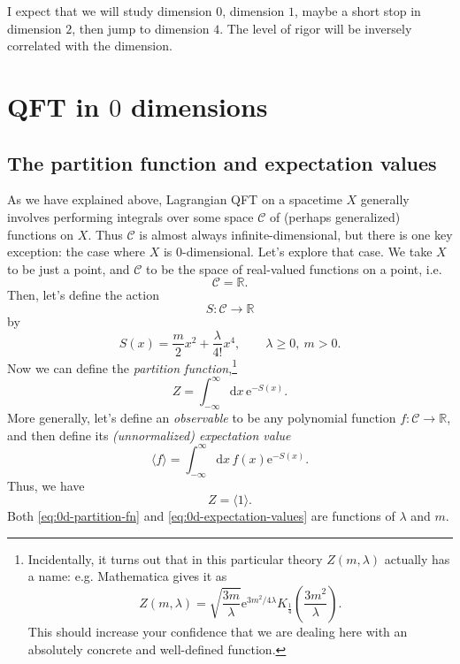\documentclass[12pt,letterpaper,reqno]{article}
\numberwithin{equation}{section}
\newcommand{\cC}{\ensuremath{\mathcal C}}
\newcommand{\R}{\ensuremath{\mathbb R}}
\newcommand{\e}{{\mathrm e}}
\newcommand{\de}{\mathrm{d}}
\newcommand{\IP}[1]{\langle#1\rangle}
\newcommand{\ti}[1]{\textit{#1}}
\begin{document}
I expect that we will study dimension $0$, dimension $1$, maybe a short stop in dimension $2$,
then jump to dimension $4$. The level of rigor will be inversely correlated with the dimension.





\section{QFT in \texorpdfstring{$0$}{0} dimensions} \label{sec:0d-qft}

\subsection{The partition function and expectation values}

As we have explained above, Lagrangian QFT on a spacetime $X$ generally involves performing integrals
over some space $\cC$ of (perhaps generalized) functions on $X$. Thus $\cC$ is almost 
always infinite-dimensional,
but there is one key exception: the case where $X$ is $0$-dimensional. Let's explore that case.
We take $X$ to be just a point,
and $\cC$ to be the space of real-valued functions on a point, i.e.
\begin{equation}
  \cC = \R.
\end{equation}
Then, let's define the action
\begin{equation}
  S: \cC \to \R
\end{equation}
by
\begin{equation} \label{eq:0d-action-quartic}
  S(x) = \frac{m}{2} x^2 + \frac{\lambda}{4!} x^4, \qquad \lambda \ge 0, \ m > 0.
\end{equation}
Now we can define the \ti{partition function},\footnote{Incidentally, it turns out that in this particular theory $Z(m,\lambda)$ 
actually has a name: e.g. Mathematica gives it as
\begin{equation}
  Z(m,\lambda) = \sqrt{\frac{3m}{\lambda}} \e^{3 m^2 / 4 \lambda} K_{\frac14} \left(\frac{3m^2}{\lambda}\right).
\end{equation}
This should increase your confidence that we are dealing here with
an absolutely concrete and well-defined function.}
\begin{equation} \label{eq:0d-partition-fn}
  Z = \int_{-\infty}^\infty \de x \, \e^{-S(x)}.
\end{equation}
More generally, let's define an \ti{observable} to be any polynomial function $f: \cC \to \R$, and
then define its \ti{(unnormalized) expectation value}
\begin{equation} \label{eq:0d-expectation-values}
  \IP{f} = \int_{-\infty}^\infty \de x \, f(x) \e^{-S(x)}.
\end{equation}
Thus, we have
\begin{equation}
  Z = \IP{1}.
\end{equation}
Both \eqref{eq:0d-partition-fn} and \eqref{eq:0d-expectation-values} are functions of
$\lambda$ and $m$.
\end{document}
